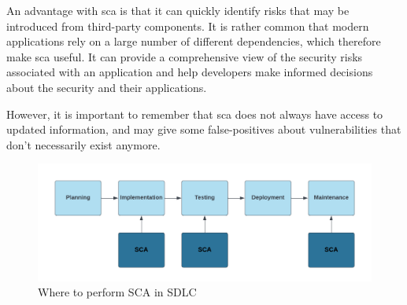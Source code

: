 An advantage with \acrshort{sca} is that it can quickly identify risks that may be introduced from third-party components. It is rather common that modern applications rely on a large number of different dependencies, which therefore make \acrshort{sca} useful. It can provide a comprehensive view of the security risks associated with an application and help developers make informed decisions about the security and their applications. 

However, it is important to remember that \acrshort{sca} does not always have access to updated information, and may give some false-positives about vulnerabilities that don't necessarily exist anymore. 
\\
\begin{figure}[H]
    \centering
    \includegraphics[width=0.8\columnwidth]{Images/sca.png}
    \caption{Where to perform SCA in SDLC} 
    \label{fig: Where to perform SCA in SDLC}
\end{figure}

\newpage
